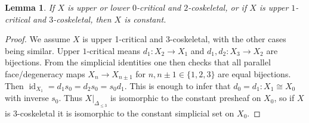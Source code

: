 \documentclass{amsart}
\newcommand{\decbot}{\operatorname{dec}_\bot}
\newcommand{\dectop}{\operatorname{dec}_\top}
\newtheorem{lemma}[theorem]{Lemma}
\theoremstyle{definition}
\theoremstyle{remark}
\begin{document}
\begin{lemma}\label{lem k=0 case}
If $X$ is upper or lower $0$-critical and $2$-coskeletal, or if $X$ is upper $1$-critical and $3$-coskeletal, then $X$ is constant.
\end{lemma}
\begin{proof}
We assume $X$ is upper 1-critical and 3-coskeletal, with the other cases being similar.
Upper $1$-critical means $d_1 \colon X_2 \to X_1$ and $d_1,d_2 \colon X_3 \to X_2$ are bijections.
From the simplicial identities one then checks that all parallel face/degeneracy maps $X_n \to X_{n \pm 1}$ for $n, n\pm 1 \in \{1,2,3\}$ are equal bijections.
Then $\operatorname{id}_{X_1} = d_1s_0 = d_2 s_0 = s_0 d_1$.
This is enough to infer that $d_0 = d_1 \colon X_1 \cong X_0$ with inverse $s_0$.
Thus $X|_{\Delta_{\leq 3}}$ is isomorphic to the constant presheaf on $X_0$, so if $X$ is $3$-coskeletal it is isomorphic to the constant simplicial set on $X_0$.
\end{proof}
\end{document}
